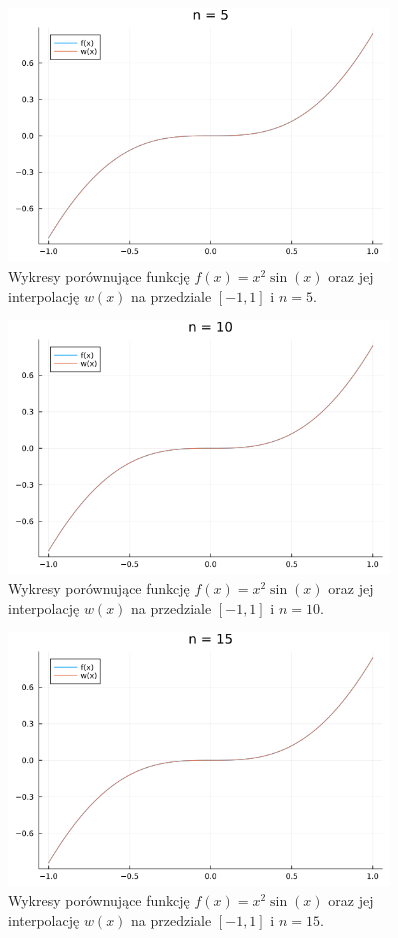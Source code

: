 \documentclass{article}
\begin{document}
\begin{figure}[H]
    \centering
    \includegraphics[width=0.9\textwidth]{../plots/ex4_2_n5.png}
    \caption{Wykresy porównujące funkcję $f(x) = x^2\sin(x)$ oraz jej interpolację $w(x)$ na przedziale $[-1, 1]$ i $n=5$.}
\end{figure}
\begin{figure}[H]
    \centering
    \includegraphics[width=0.9\textwidth]{../plots/ex4_2_n10.png}
    \caption{Wykresy porównujące funkcję $f(x) = x^2\sin(x)$ oraz jej interpolację $w(x)$ na przedziale $[-1, 1]$ i $n=10$.}
\end{figure}
\begin{figure}[H]
    \centering
    \includegraphics[width=0.9\textwidth]{../plots/ex4_2_n15.png}
    \caption{Wykresy porównujące funkcję $f(x) = x^2\sin(x)$ oraz jej interpolację $w(x)$ na przedziale $[-1, 1]$ i $n=15$.}
\end{figure}
\end{document}
